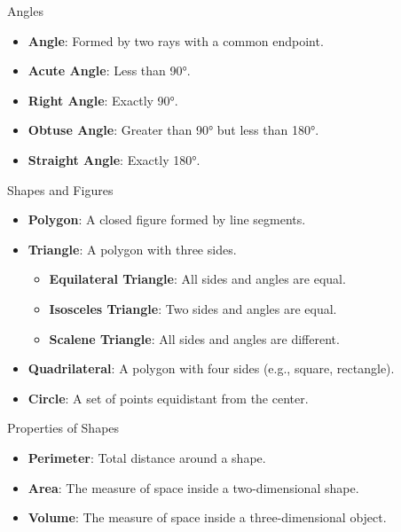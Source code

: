 \documentclass{beamer}
\begin{document}
\begin{frame}{Angles}
    \begin{itemize}
        \item \textbf{Angle}: Formed by two rays with a common endpoint.
        \item \textbf{Acute Angle}: Less than 90°.
        \item \textbf{Right Angle}: Exactly 90°.
        \item \textbf{Obtuse Angle}: Greater than 90° but less than 180°.
        \item \textbf{Straight Angle}: Exactly 180°.
    \end{itemize}
\end{frame}

\begin{frame}{Shapes and Figures}
    \begin{itemize}
        \item \textbf{Polygon}: A closed figure formed by line segments.
        \item \textbf{Triangle}: A polygon with three sides.
        \begin{itemize}
            \item \textbf{Equilateral Triangle}: All sides and angles are equal.
            \item \textbf{Isosceles Triangle}: Two sides and angles are equal.
            \item \textbf{Scalene Triangle}: All sides and angles are different.
        \end{itemize}
        \item \textbf{Quadrilateral}: A polygon with four sides (e.g., square, rectangle).
        \item \textbf{Circle}: A set of points equidistant from the center.
    \end{itemize}
\end{frame}

\begin{frame}{Properties of Shapes}
    \begin{itemize}
        \item \textbf{Perimeter}: Total distance around a shape.
        \item \textbf{Area}: The measure of space inside a two-dimensional shape.
        \item \textbf{Volume}: The measure of space inside a three-dimensional object.
    \end{itemize}
\end{frame}
\end{document}
